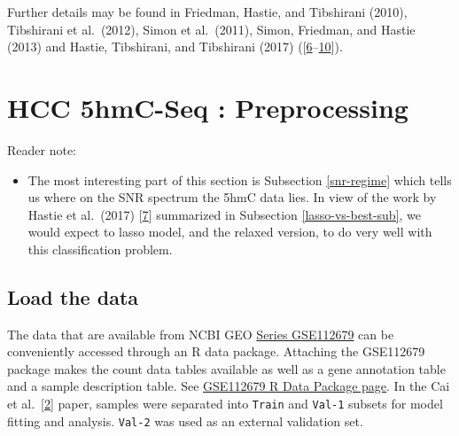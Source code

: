 \documentclass[
]{book}
\providecommand{\tightlist}{%
  \setlength{\itemsep}{0pt}\setlength{\parskip}{0pt}}
\begin{document}
Further details may be found in
Friedman, Hastie, and Tibshirani (2010),
Tibshirani et al.~(2012),
Simon et al.~(2011),
Simon, Friedman, and Hastie (2013) and
Hastie, Tibshirani, and Tibshirani (2017)
({[}\protect\hyperlink{ref-Friedman:2010aa}{6}--\protect\hyperlink{ref-Simon:2013aa}{10}{]}).

\hypertarget{hcc-5hmcseq-preproc}{%
\chapter{HCC 5hmC-Seq : Preprocessing}\label{hcc-5hmcseq-preproc}}

Reader note:

\begin{itemize}
\tightlist
\item
  The most interesting part of this section is Subsection \ref{snr-regime}
  which tells us where on the SNR spectrum the 5hmC data lies.
  In view of the work by Hastie et al.~(2017) {[}\protect\hyperlink{ref-Hastie:2017aa}{7}{]}
  summarized in Subsection \ref{lasso-vs-best-sub}, we would expect to
  lasso model, and the relaxed version, to do very well with this
  classification problem.
\end{itemize}

\hypertarget{load-the-data}{%
\section{Load the data}\label{load-the-data}}

The data that are available from NCBI GEO
\href{https://www.ncbi.nlm.nih.gov/geo/query/acc.cgi?acc=GSE112679}{Series GSE112679}
can be conveniently accessed through an R data package.
Attaching the GSE112679 package makes the count data tables
available as well as a gene annotation table and a sample description table.
See \href{https://12379monty.github.io/GSE112679/}{GSE112679 R Data Package page}.
In the Cai et al.~{[}\protect\hyperlink{ref-Cai:2019aa}{2}{]} paper, samples were separated into
\texttt{Train} and \texttt{Val-1} subsets for model fitting and analysis.
\texttt{Val-2} was used as an external validation set.
\end{document}
